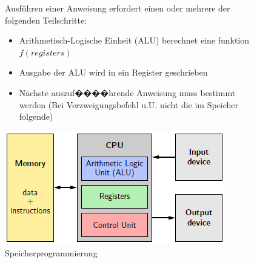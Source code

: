 \documentclass[12pt]{report}
\begin{document}
\begin{figure}[H]
  \begin{minipage}[t]{0.48\textwidth}
    Ausführen einer Anweisung erfordert einen oder mehrere der folgenden Teilschritte:
    \begin{itemize}
      \item Arithmetisch-Logische Einheit (ALU) berechnet eine funktion $f(registers)$
      \item Ausgabe der ALU wird in ein Register geschrieben
      \item Nächste auszuf����hrende Anweisung muss bestimmt werden (Bei Verzweigungsbefehl u.U. nicht die im Speicher folgende)
    \end{itemize}
  \end{minipage}
  \hfill
  \begin{minipage}[t]{0.48\textwidth}
    \caption{Speicherprogrammierung}
    \centering
    \includegraphics[width=\textwidth]{speicherprogrammierung_diagramm}
  \end{minipage}
\end{figure}
\end{document}
